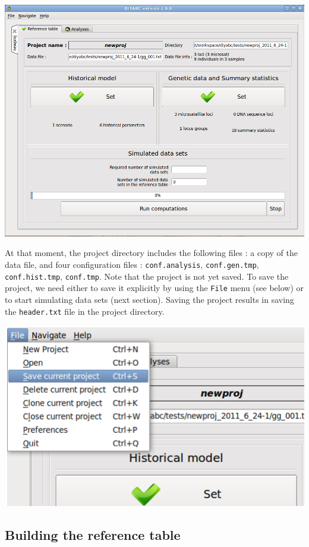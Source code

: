 \includegraphics[scale=0.35]{gui_pictures/Capture-DIYABC-22.png} 

At that moment, the project directory includes the following files : a copy of the data file, and four configuration files : \texttt{conf.analysis}, \texttt{conf.gen.tmp}, \texttt{conf.hist.tmp}, \texttt{conf.tmp}. Note that the project is not yet saved. To save the project, we need either to save it explicitly by using the \texttt{File} menu (see below) or to start simulating data sets (next section). Saving the project results in saving the \texttt{header.txt} file in the project directory.


\includegraphics[scale=0.35]{gui_pictures/Capture-DIYABC-23.png} 

\subsection{Building the reference table}


